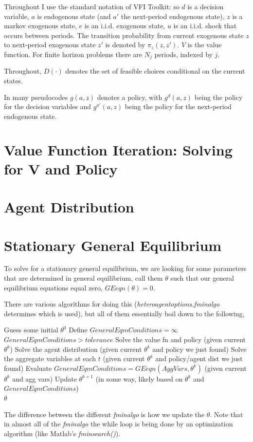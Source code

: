 \documentclass[11pt,fleqn]{article}
\begin{document}
Throughout I use the standard notation of VFI Toolkit: so $d$ is a decision variable, $a$ is endogenous state (and $a'$ the next-period endogenous state), $z$ is a markov exogenous state, $e$ is an i.i.d. exogenous state, $u$ is an i.i.d. shock that occurs between periods. The transition probability from current exogenous state $z$ to next-period exogenous state $z'$ is denoted by $\pi_z(z,z')$. $V$ is the value function. For finite horizon problems there are $N_j$ periods, indexed by $j$.

Throughout, $D(\cdot)$ denotes the set of feasible choices conditional on the current states.

In many pseudocodes $g(a,z)$ denotes a policy, with $g^d(a,z)$ being the policy for the decision variables and $g^{a'}(a,z)$ being the policy for the next-period endogenous state.

\section{Value Function Iteration: Solving for V and Policy}





\section{Agent Distribution}






\section{Stationary General Equilibrium}
To solve for a stationary general equilibrium, we are looking for some parameters that are determined in general equilibrium, call them $\theta$ such that our general equilibrium equations equal zero, $GEeqn(\theta)=0$.

There are various algorithms for doing this (\textit{heteroagentoptions.fminalgo} determines which is used), but all of them essentially boil down to the following,
\begin{algorithmic}
 \State Guess some initial $\theta^0$
 \State Define $GeneralEqmConditions=\infty$
 \While $GeneralEqmConditions>tolerance$
 \State Solve the value fn and policy (given current $\theta^k$)
 \State Solve the agent distribution (given current $\theta^k$ and policy we just found)
 \State Solve the aggregate variables at each $t$ (given current $\theta^k$ and policy/agent dist we just found)
 \State Evaluate $GeneralEqmConditions=GEeqn(AggVars,\theta^k)$ (given current $\theta^k$ and agg vars)
 \State Update $\theta^{k+1}$ (in some way, likely based on $\theta^k$ and $GeneralEqmConditions$)
 \EndWhile
 \\ \Return $\theta$
\end{algorithmic}
The difference between the different \textit{fminalgo} is how we update the $\theta$. Note that in almost all of the \textit{fminalgo} the while loop is being done by an optimization algorithm (like Matlab's \textit{fminsearch()}).
\end{document}
